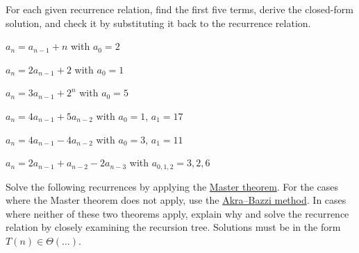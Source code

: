 \documentclass[a4paper,12pt]{article}
\begin{document}

\begin{tasks}[align=right,left=0pt]
    \item For each given recurrence relation, find the first five terms, derive the closed-form solution, and check it by substituting it back to the recurrence relation.

    \begin{multicols}{2}
    \begin{subtasks}

        \item $a_n = a_{n-1} + n$ with $a_0 = 2$

        \item $a_n = 2a_{n-1} + 2$ with $a_0 = 1$

        \item $a_n = 3a_{n-1} + 2^n$ with $a_0 = 5$

        \item $a_n = 4a_{n-1} + 5a_{n-2}$ with $a_0 = 1$, $a_1 = 17$

        \item $a_n = 4a_{n-1} - 4a_{n-2}$ with $a_0 = 3$, $a_1 = 11$

        \item $a_n = 2a_{n-1} + a_{n-2} - 2a_{n-3}$ with $a_{0,1,2} = 3,2,6$
    \end{subtasks}
    \end{multicols}


    \item Solve the following recurrences by applying the \href{https://en.wikipedia.org/wiki/Master_theorem_(analysis_of_algorithms)}{Master theorem}.
    For the cases where the Master theorem does not apply, use the \href{https://en.wikipedia.org/wiki/Akra-Bazzi_method}{Akra--Bazzi method}.
    In cases where neither of these two theorems apply, explain why and solve the recurrence relation by closely examining the recursion tree.
    Solutions must be in the form $T(n) \in \Theta(\dots)$.


\end{tasks}
\end{document}
